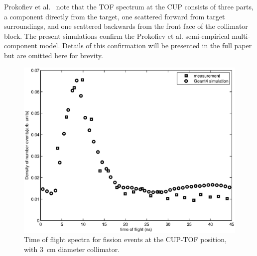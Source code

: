\documentclass[peerreviewca,11pt,a4paper]{IEEEtran}
\let\MYoriglatexcaption\caption
\renewcommand{\caption}[2][\relax]{\MYoriglatexcaption[#2]{#2}}
\def\U238{\BPChem{\^{238}U}}
\begin{document}
Prokofiev et al.~\cite{Prokofiev2014} note that the TOF spectrum at the CUP consists of three parts, a component directly from the target, one scattered forward from target surroundings, and one scattered backwards from the front face of the collimator block.
The present simulations confirm the Prokofiev et al. semi-empirical multi-component model. Details of this confirmation will be presented in the full paper but are omitted here for brevity.

\begin{figure}[t]
    \centering
    \includegraphics[width=0.9\columnwidth]{CUPTOFtofspectraRADECS.eps}
    \caption{
        Time of flight spectra for \U238 fission events at the CUP-TOF position, with \SI{3}{\cm} diameter collimator.
        }
    \label{fig:TOFSpectra}
\end{figure}
\end{document}
